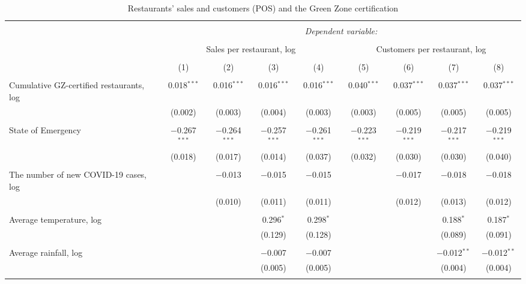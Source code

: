 
\begin{sidewaystable}[!htbp] \centering 
  \caption{Restaurants' sales and customers (POS) and the Green Zone certification} 
  \label{} 
\footnotesize 
\begin{tabular}{@{\extracolsep{1pt}}lcccccccc} 
\\[-1.8ex]\hline 
\hline \\[-1.8ex] 
 & \multicolumn{8}{c}{\textit{Dependent variable:}} \\ 
\cline{2-9} 
\\[-1.8ex] & \multicolumn{4}{c}{Sales per restaurant, log} & \multicolumn{4}{c}{Customers per restaurant, log} \\ 
\\[-1.8ex] & (1) & (2) & (3) & (4) & (5) & (6) & (7) & (8)\\ 
\hline \\[-1.8ex] 
 Cumulative GZ-certified restaurants, log & 0.018$^{***}$ & 0.016$^{***}$ & 0.016$^{***}$ & 0.016$^{***}$ & 0.040$^{***}$ & 0.037$^{***}$ & 0.037$^{***}$ & 0.037$^{***}$ \\ 
  & (0.002) & (0.003) & (0.004) & (0.003) & (0.003) & (0.005) & (0.005) & (0.005) \\ 
  & & & & & & & & \\ 
 State of Emergency & $-$0.267$^{***}$ & $-$0.264$^{***}$ & $-$0.257$^{***}$ & $-$0.261$^{***}$ & $-$0.223$^{***}$ & $-$0.219$^{***}$ & $-$0.217$^{***}$ & $-$0.219$^{***}$ \\ 
  & (0.018) & (0.017) & (0.014) & (0.037) & (0.032) & (0.030) & (0.030) & (0.040) \\ 
  & & & & & & & & \\ 
 The number of new COVID-19 cases, log &  & $-$0.013 & $-$0.015 & $-$0.015 &  & $-$0.017 & $-$0.018 & $-$0.018 \\ 
  &  & (0.010) & (0.011) & (0.011) &  & (0.012) & (0.013) & (0.012) \\ 
  & & & & & & & & \\ 
 Average temperature, log &  &  & 0.296$^{*}$ & 0.298$^{*}$ &  &  & 0.188$^{*}$ & 0.187$^{*}$ \\ 
  &  &  & (0.129) & (0.128) &  &  & (0.089) & (0.091) \\ 
  & & & & & & & & \\ 
 Average rainfall, log &  &  & $-$0.007 & $-$0.007 &  &  & $-$0.012$^{**}$ & $-$0.012$^{**}$ \\ 
  &  &  & (0.005) & (0.005) &  &  & (0.004) & (0.004) \\ 
  & & & & & & & & \\ 

\end{tabular}
\end{sidewaystable}
